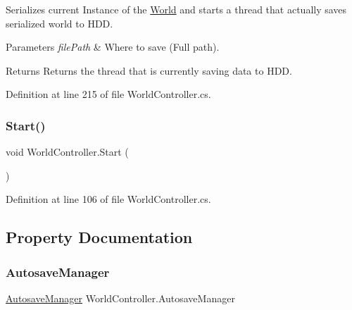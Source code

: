 Serializes current Instance of the \hyperlink{class_world}{World} and starts a thread that actually saves serialized world to H\+DD. 


\begin{DoxyParams}{Parameters}
{\em file\+Path} & Where to save (Full path).\\
\hline
\end{DoxyParams}
\begin{DoxyReturn}{Returns}
Returns the thread that is currently saving data to H\+DD.
\end{DoxyReturn}


Definition at line 215 of file World\+Controller.\+cs.

\mbox{\label{class_world_controller_a75c2c9eb9749acbc48ba5d74d101f3ba}} 
\subsubsection{\texorpdfstring{Start()}{Start()}}
{\footnotesize\ttfamily void World\+Controller.\+Start (\begin{DoxyParamCaption}{ }\end{DoxyParamCaption})}



Definition at line 106 of file World\+Controller.\+cs.



\subsection{Property Documentation}
\mbox{\label{class_world_controller_a47f20dc0e6593e64950ab9f6c0a2744d}} 
\subsubsection{\texorpdfstring{Autosave\+Manager}{AutosaveManager}}
{\footnotesize\ttfamily \hyperlink{class_autosave_manager}{Autosave\+Manager} World\+Controller.\+Autosave\+Manager\hspace{0.3cm}{\ttfamily [get]}}



